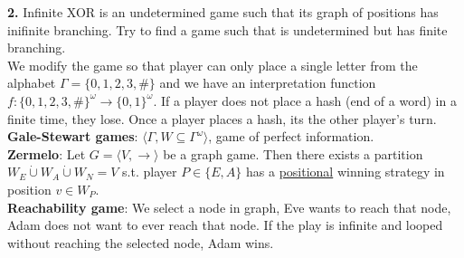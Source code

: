 \noindent
\textbf{2.} Infinite XOR is an undetermined game such that its graph of positions has inifinite branching. Try to find a game such that
is undetermined but has finite branching.\\
We modify the game so that player can only place a single letter from the alphabet $\Gamma = \{0, 1, 2, 3, \#\}$ and we have an interpretation function
$f : \{0, 1, 2, 3, \#\}^\omega \rightarrow \{0, 1\}^\omega$. If a player does not place a hash (end of a word) in a finite time, they lose. Once a player
places a hash, its the other player's turn.\\

\noindent
\textbf{Gale-Stewart games}: $\langle \Gamma, W \subseteq \Gamma^\omega \rangle$, game of perfect information.\\

\noindent
\textbf{Zermelo}: Let $G = \langle V, \rightarrow \rangle$ be a graph game. Then there exists a partition $W_E \dot\cup W_A \dot\cup W_N = V$
s.t. player $P \in \{E, A\}$ has a \underline{positional} winning strategy in position $v \in W_P$.\\

\noindent
\textbf{Reachability game}: We select a node in graph, Eve wants to reach that node, Adam does not want to ever reach that node. If the play is infinite and looped
without reaching the selected node, Adam wins.
